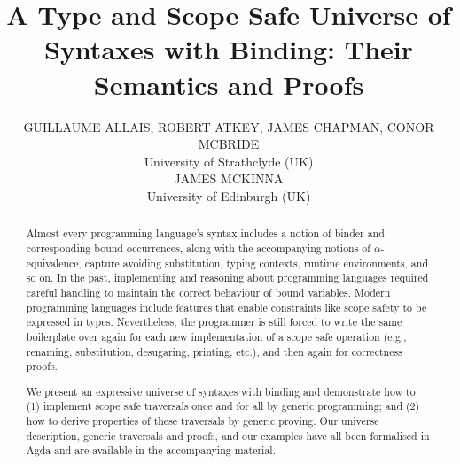\documentclass{jfp1}
\title
  [A Type and Scope Safe Universe of Syntaxes with Binding]
  {A Type and Scope Safe Universe of Syntaxes with Binding: Their Semantics and Proofs}
\author[G. Allais et al.]
 { GUILLAUME ALLAIS,
   ROBERT ATKEY,
   JAMES CHAPMAN,
   CONOR MCBRIDE\\
   University of Strathclyde (UK)\\
   JAMES MCKINNA\\
   University of Edinburgh (UK)
  }
\begin{document}
\maketitle
\begin{abstract}
Almost every programming language's syntax includes a notion of binder
and corresponding bound occurrences, along with the accompanying
notions of $\alpha$-equivalence, capture avoiding substitution, typing
contexts, runtime environments, and so on. In the past, implementing
and reasoning about programming languages required careful handling to
maintain the correct behaviour of bound variables. Modern programming
languages include features that enable constraints like scope safety
to be expressed in types. Nevertheless, the programmer is still forced
to write the same boilerplate over again for each new implementation
of a scope safe operation (e.g., renaming, substitution, desugaring,
printing, etc.), and then again for correctness proofs.

We present an expressive universe of syntaxes with binding and
demonstrate how to (1) implement scope safe traversals once and for
all by generic programming; and (2) how to derive properties of these
traversals by generic proving. Our universe description, generic
traversals and proofs, and our examples have all been formalised in
Agda and are available in the accompanying material.
\end{abstract}





\end{document}
